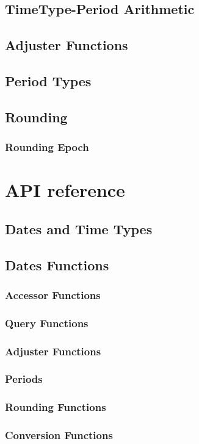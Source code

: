     \section{TimeType-Period Arithmetic}
    \section{Adjuster Functions}
    \section{Period Types}
    \section{Rounding}
    \subsection{Rounding Epoch}
\chapter{API reference}
    \section{Dates and Time Types}
    \section{Dates Functions}
    \subsection{Accessor Functions}
    \subsection{Query Functions}
    \subsection{Adjuster Functions}
    \subsection{Periods}
    \subsection{Rounding Functions}
    \subsection{Conversion Functions}
